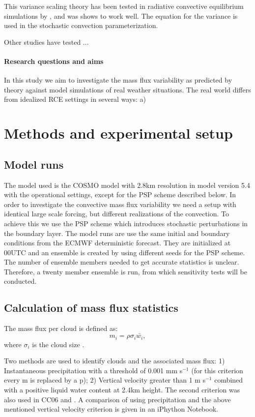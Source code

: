 \documentclass[a4paper, 12pt]{article}
\begin{document}
This variance scaling theory has been tested in radiative convective equilibrium simulations by \cite{Cohen2006}, and was shows to work well. The equation for the variance is used in the \cite{Plant2008} stochastic convection parameterization.

Other studies have tested ...

\paragraph{Research questions and aims} In this study we aim to investigate the mass flux variability as predicted by theory against model simulations of real weather situations. The real world differs from idealized RCE settings in several ways: a) 



\section{Methods and experimental setup}
\subsection{Model runs}
The model used is the COSMO model with 2.8km resolution in model version 5.4 with the operational settings, except for the PSP scheme described below. 
In order to investigate the convective mass flux variability we need a setup with identical large scale forcing, but different realizations of the convection. To achieve this we use the PSP scheme which introduces stochastic perturbations in the boundary layer. 
The model runs are use the same initial and boundary conditions from the ECMWF deterministic forecast. They are initialized at 00UTC and an ensemble is created by using different seeds for the PSP scheme. The number of ensemble members needed to get accurate statistics is unclear. Therefore, a twenty member ensemble is run, from which sensitivity tests will be conducted. 

\subsection{Calculation of mass flux statistics} 
The mass flux per cloud is defined as:
\begin{equation}
\label{eq:def_m}
 m_i = \rho \sigma_i \bar{w_i},
\end{equation}
where $\sigma_i$ is the cloud size \citep{Cohen2006}. 

Two methods are used to identify clouds and the associated mass flux: 1) Instantaneous precipitation with a threshold of 0.001 mm s$^{-1}$ (for this criterion every m is replaced by a p); 2) Vertical velocity greater than 1 m s$^{-1}$ combined with a positive liquid water content at 2.4km height. The second criterion was also used in CC06 and  \cite{Davoudi2010}. A comparison of using precipitation and the above mentioned vertical velocity criterion is given in an iPhython Notebook. 
\end{document}
